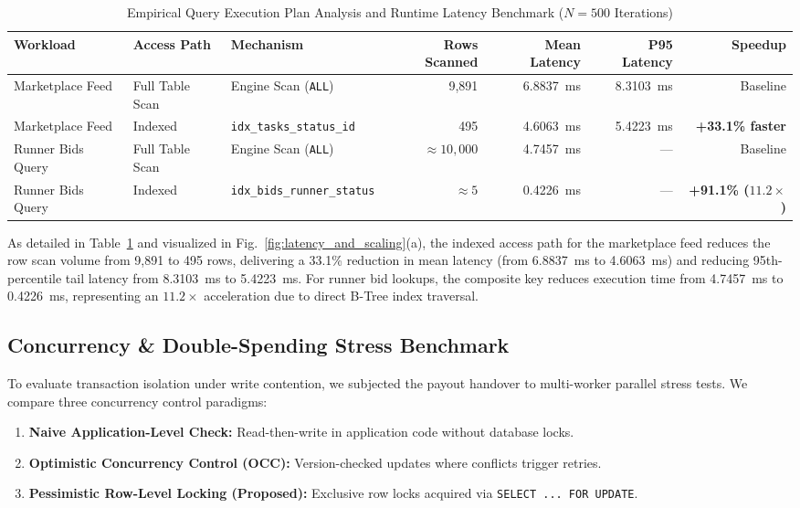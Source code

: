 \documentclass[conference]{IEEEtran}
\begin{document}
\begin{table}[t]
\centering
\footnotesize
\caption{Empirical Query Execution Plan Analysis and Runtime Latency Benchmark ($N = 500$ Iterations)}
\label{tab:index_benchmark}
\begin{tabular*}{\textwidth}{@{\extracolsep{\fill}}lllrrrr@{}}
\toprule
\textbf{Workload} & \textbf{Access Path} & \textbf{Mechanism} & \textbf{Rows Scanned} & \textbf{Mean Latency} & \textbf{P95 Latency} & \textbf{Speedup} \\
\midrule
Marketplace Feed & Full Table Scan & Engine Scan (\texttt{ALL}) & 9,891 & 6.8837~ms & 8.3103~ms & Baseline \\
Marketplace Feed & Indexed & \texttt{idx\_tasks\_status\_id} & 495 & 4.6063~ms & 5.4223~ms & \textbf{+33.1\% faster} \\
\midrule
Runner Bids Query & Full Table Scan & Engine Scan (\texttt{ALL}) & $\approx 10,000$ & 4.7457~ms & --- & Baseline \\
Runner Bids Query & Indexed & \texttt{idx\_bids\_runner\_status} & $\approx 5$ & 0.4226~ms & --- & \textbf{+91.1\% ($11.2\times$)} \\
\bottomrule
\end{tabular*}
\end{table}

As detailed in Table~\ref{tab:index_benchmark} and visualized in Fig.~\ref{fig:latency_and_scaling}(a), the indexed access path for the marketplace feed reduces the row scan volume from 9,891 to 495 rows, delivering a 33.1\% reduction in mean latency (from 6.8837~ms to 4.6063~ms) and reducing 95th-percentile tail latency from 8.3103~ms to 5.4223~ms. For runner bid lookups, the composite key reduces execution time from 4.7457~ms to 0.4226~ms, representing an $11.2\times$ acceleration due to direct B-Tree index traversal.

\subsection{Concurrency \& Double-Spending Stress Benchmark}
To evaluate transaction isolation under write contention, we subjected the payout handover to multi-worker parallel stress tests. We compare three concurrency control paradigms:
\begin{enumerate}
    \item \textbf{Naive Application-Level Check:} Read-then-write in application code without database locks.
    \item \textbf{Optimistic Concurrency Control (OCC):} Version-checked updates where conflicts trigger retries.
    \item \textbf{Pessimistic Row-Level Locking (Proposed):} Exclusive row locks acquired via \texttt{SELECT ... FOR UPDATE}.
\end{enumerate}
\end{document}
